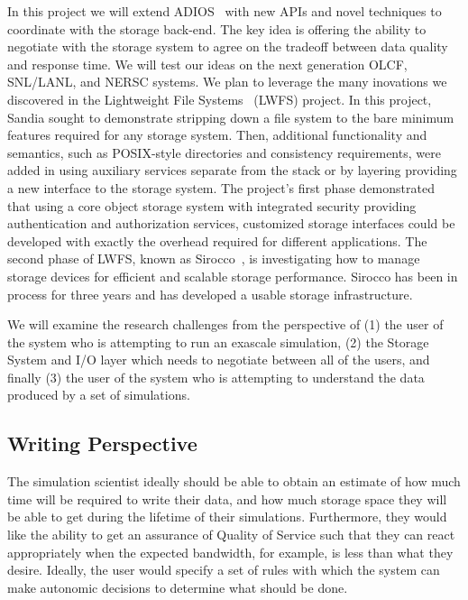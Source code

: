 In this project we will extend ADIOS~\cite{adios} with new APIs and novel techniques
to coordinate with the storage back-end. The key idea is offering the ability to
negotiate with the storage system to agree on the tradeoff between data quality
and response time. We will test our ideas on the next generation OLCF,
SNL/LANL, and NERSC systems.
%
We plan to leverage the many inovations we discovered in 
the Lightweight File Systems~\cite{lwfs} (LWFS) project.
In this project, Sandia sought to
demonstrate stripping down a file system to the bare minimum features required
for any storage system. Then, additional functionality and semantics, such as
POSIX-style directories and consistency requirements, were added in using
auxiliary services separate from the stack or by layering providing a new
interface to the storage system. The project's first phase demonstrated that
using a core object storage system with integrated security providing
authentication and authorization services, customized storage interfaces could
be developed with exactly the overhead required for different applications. The
second phase of LWFS, known as Sirocco~\cite{sirocco}, is investigating how to
manage storage devices for efficient and scalable storage performance.  Sirocco
has been in process for three years and has developed a usable storage infrastructure.

We will examine the research challenges from the perspective of
%
(1) the user of the system who is attempting to run an exascale simulation,
%
(2) the Storage System and I/O layer which needs to negotiate between all of
the users, and finally
%
(3) the user of the system who is attempting to understand the data
produced by a set of simulations.

\subsection{Writing Perspective}
\label{subsec:sim-perspective}
The simulation scientist ideally should be able to
obtain an estimate of how much time will be required to write their data,
and how much storage space they will be able to get during the lifetime of
their simulations. Furthermore, they would like the ability to get an assurance
of Quality of Service such that they can react appropriately when the
expected bandwidth, for example, is less than what they desire. Ideally, the user
would specify a set of rules with which the system can make autonomic
decisions to determine what should be done.
%

